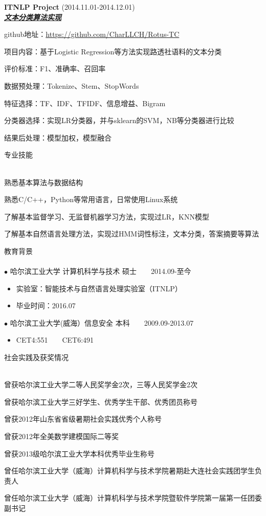 \documentclass[10pt]{article}
\newcommand{\lineunder}{\vspace*{-8pt} \\ \hspace*{-18pt} \hrulefill \\}
\newcommand{\header}[1]{{\hspace*{-15pt}\vspace*{6pt} \textsc{#1}} \vspace*{-6pt} \lineunder}
\newcommand{\employer}[3]{{ \textbf{#1} (#2)\\ \underline{\textbf{\emph{#3}}}\\  }}
\begin{document}
\employer{ITNLP Project}{2014.11.01-2014.12.01}{文本分类算法实现}
\begin{achievements}
\item github地址：\url{https://github.com/CharLLCH/Rotus-TC}
	\item 项目内容：基于Logistic Regression等方法实现路透社语料的文本分类
	\item 评价标准：F1、准确率、召回率
	\item 数据预处理：Tokenize、Stem、StopWords
	\item 特征选择：TF、IDF、TFIDF、信息增益、Bigram
	\item 分类器选择：实现LR分类器，并与sklearn的SVM，NB等分类器进行比较
	\item 结果后处理：模型加权，模型融合
\end{achievements}

\header{专业技能}
\begin{achievements}
	\item 熟悉基本算法与数据结构
	\item 熟悉C/C++，Python等常用语言，日常使用Linux系统
	\item 了解基本监督学习、无监督机器学习方法，实现过LR，KNN模型
	\item 了解基本自然语言处理方法，实现过HMM词性标注，文本分类，答案摘要等算法
\end{achievements}


\header{教育背景}

$\bullet$ 哈尔滨工业大学 计算机科学与技术 硕士~~~~2014.09-至今
\begin{itemize}
	\item 实验室：智能技术与自然语言处理实验室（ITNLP） 
	\item 毕业时间：2016.07
\end{itemize}

$\bullet$ 哈尔滨工业大学(威海）信息安全 本科~~~~2009.09-2013.07
\begin{itemize}
	\item CET4:551~~~~CET6:491
\end{itemize}

\header{社会实践及获奖情况}
\begin{achievements}
	\item 曾获哈尔滨工业大学二等人民奖学金2次，三等人民奖学金2次
	\item 曾获哈尔滨工业大学三好学生、优秀学生干部、优秀团员称号
	\item 曾获2012年山东省省级暑期社会实践优秀个人称号
	\item 曾获2012年全美数学建模国际二等奖
	\item 曾获2013级哈尔滨工业大学本科优秀毕业生称号
	\item 曾任哈尔滨工业大学（威海）计算机科学与技术学院暑期赴大连社会实践团学生负责人
	\item 曾任哈尔滨工业大学（威海）计算机科学与技术学院暨软件学院第一届第一任团委副书记
\end{achievements}
\end{document}
